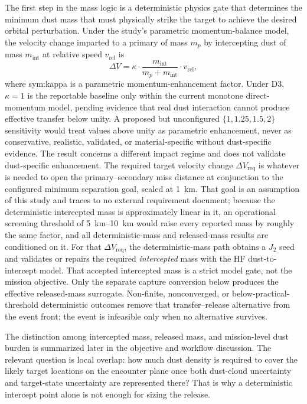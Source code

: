     The first step in the mass logic is a deterministic physics gate that determines the minimum dust mass that must physically strike the target to achieve the desired orbital perturbation. Under the study's parametric momentum-balance model, the velocity change imparted to a primary of mass \(m_p\) by intercepting dust of mass \(m_{\mathrm{int}}\) at relative speed \(v_{\mathrm{rel}}\) is
    \begin{equation}
        \Delta V = \kappa \cdot \frac{m_{\mathrm{int}}}{m_p + m_{\mathrm{int}}} \cdot v_{\mathrm{rel}},
        \label{eq:dart_momentum}
    \end{equation}
    where \gls{sym:kappa} is a parametric momentum-enhancement factor. Under D3, \(\kappa=1\) is the reportable baseline only within the current monotone direct-momentum model, pending evidence that real dust interaction cannot produce effective transfer below unity. A proposed but unconfigured \(\{1,1.25,1.5,2\}\) sensitivity would treat values above unity as parametric enhancement, never as conservative, realistic, validated, or material-specific without dust-specific evidence. The  result \cite{cheng2023dart} concerns a different impact regime and does not validate dust-specific enhancement. The required target velocity change \(\Delta V_{\mathrm{req}}\) is whatever is needed to open the primary--secondary miss distance at conjunction to the configured minimum separation goal, sealed at \SI{1}{\kilo\metre}. That goal is an assumption of this study and traces to no external requirement document; because the deterministic intercepted mass is approximately linear in it, an operational screening threshold of \SIrange{5}{10}{\kilo\metre} would raise every reported mass by roughly the same factor, and all deterministic-mass and released-mass results are conditioned on it. For that \(\Delta V_{\mathrm{req}}\), the deterministic-mass path obtains a \(J_2\) seed and validates or repairs the required \emph{intercepted} mass with the HF dust-to-intercept model. That accepted intercepted mass is a strict model gate, not the mission objective. Only the separate capture conversion below produces the effective released-mass surrogate. Non-finite, nonconverged, or below-practical-threshold deterministic outcomes remove that transfer--release alternative from the event front; the event is infeasible only when no alternative survives.

    The distinction among intercepted mass, released mass, and mission-level dust burden is summarized later in the objective and workflow discussion. The relevant question is local overlap: how much dust density is required to cover the likely target locations on the encounter plane once both dust-cloud uncertainty and target-state uncertainty are represented there? That is why a deterministic intercept point alone is not enough for sizing the release.

